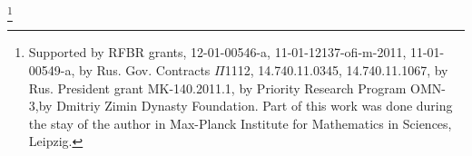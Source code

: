 \thanks{Supported by RFBR grants, 
12-01-00546-a, 11-01-12137-ofi-m-2011, 11-01-00549-a, by
Rus. Gov. Contracts $\Pi$1112, 14.740.11.0345, 14.740.11.1067, by
Rus. President grant MK-140.2011.1, by Priority Research Program OMN-3,by Dmitriy Zimin Dynasty
Foundation. Part of this work was done during the stay of the author
in Max-Planck Institute for Mathematics in Sciences, Leipzig.}

